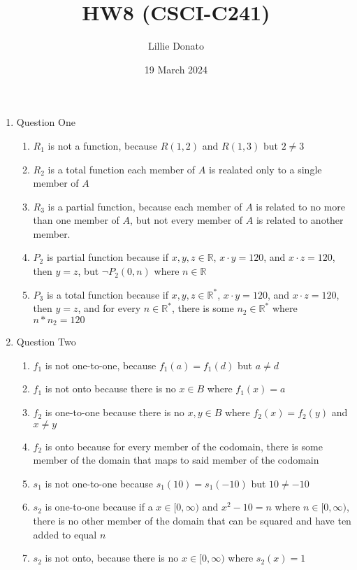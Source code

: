 \documentclass{article}
\title{HW8 (CSCI-C241)}
\author{Lillie Donato}
\date{19 March 2024}
\begin{document}
\maketitle

\begin{enumerate}
    \item Question One
    \begin{enumerate}
        \item $R_1$ is not a function, because $R(1, 2)$ and $R(1, 3)$ but $2 \neq 3$
        \item $R_2$ is a total function each member of $A$ is realated only to a single member of $A$
        \item $R_3$ is a partial function, because each member of $A$ is related to no more than one member of $A$, but not every member of $A$ is related to another member.
        \item $P_2$ is partial function because if $x,y,z \in \mathbb{R}$, $x \cdot y=120$, and $x \cdot z = 120$, then $y = z$, but $\neg P_2(0, n)$ where $n \in \mathbb{R}$
        \item $P_3$ is a total function because if $x,y,z \in \mathbb{R}^*$, $x \cdot y=120$, and $x \cdot z = 120$, then $y = z$, and for every $n \in \mathbb{R}^*$, there is some $n_2 \in \mathbb{R}^*$ where $n*n_2 = 120$
    \end{enumerate}
    \item Question Two
    \begin{enumerate}
        \item $f_1$ is not one-to-one, because $f_1(a) = f_1(d)$ but $a \neq d$
        \item $f_1$ is not onto because there is no $x \in B$ where $f_1(x) = a$
        \item $f_2$ is one-to-one because there is no $x,y \in B$ where $f_2(x) = f_2(y)$ and $x \neq y$
        \item $f_2$ is onto because for every member of the codomain, there is some member of the domain that maps to said member of the codomain 
        \item $s_1$ is not one-to-one because $s_1(10) = s_1(-10)$ but $10 \neq -10$
        \item $s_2$ is one-to-one because if a $x \in [0,\infty)$ and $x^2 - 10 = n$ where $n \in [0, \infty)$, there is no other member of the domain that can be squared and have ten added to equal $n$
        \item $s_2$ is not onto, because there is no $x \in [0,\infty)$ where $s_2(x) = 1$

\end{enumerate}
\end{enumerate}
\end{document}

